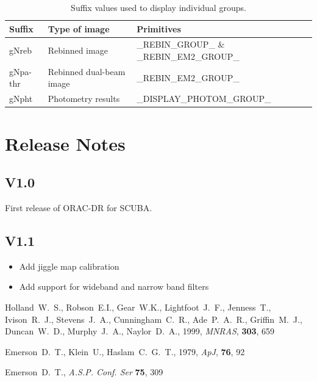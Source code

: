 \documentclass[twoside,11pt,nolof]{starlink}
\begin{document}
\begin{table}
\begin{center}
\begin{tabular}{lll}
Suffix & Type of image &Primitives \\ \hline
gNreb  &Rebinned image & \_REBIN\_GROUP\_ \& \_REBIN\_EM2\_GROUP\_ \\
gNpa-thr & Rebinned dual-beam image & \_REBIN\_EM2\_GROUP\_ \\
gNpht & Photometry results & \_DISPLAY\_PHOTOM\_GROUP\_ \\
\hline
\end{tabular}
\caption{Suffix values used to display individual groups.}
\label{tab:groupgui_id}
\end{center}
\end{table}

\section{Release Notes}

\subsection{V1.0}

First release of ORAC-DR for SCUBA.

\subsection{V1.1}

\begin{itemize}
\item Add jiggle map calibration
\item Add support for wideband and narrow band filters
\end{itemize}

\begin{thebibliography}{}

Holland~W.~S., Robson~E.I., Gear~W.K., Lightfoot~J.~F., Jenness~T.,
Ivison~R.~J., Stevens~J.~A., Cunningham~C.~R., Ade~P.~A.~R.,
Griffin~M.~J., Duncan~W.~D., Murphy~J.~A., Naylor~D.~A., 1999,
\textit{MNRAS}, \textbf{303}, 659

Emerson~D.~T., Klein~U., Haslam~C.~G.~T., 1979, \textit{ApJ}, \textbf{76}, 92

Emerson~D.~T., \textit{A.S.P. Conf. Ser} \textbf{75}, 309


\end{thebibliography}
\end{document}
